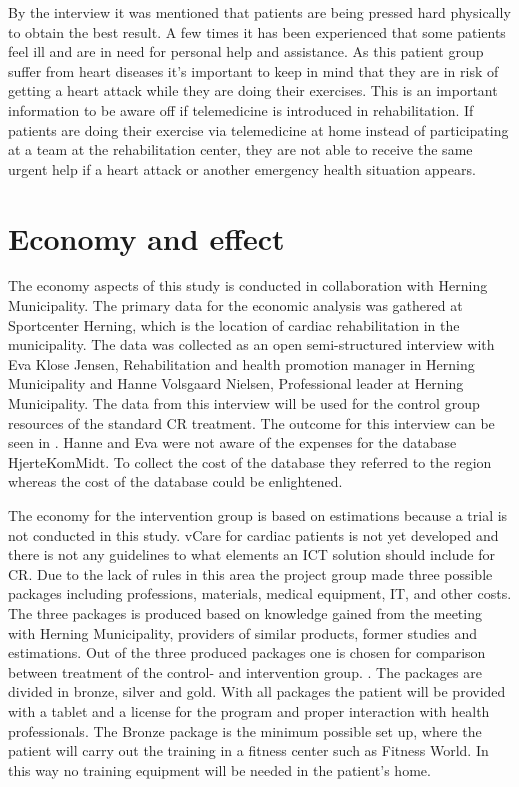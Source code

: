 By the interview it was mentioned that patients are being pressed hard physically to obtain the best result. A few times it has been experienced that some patients feel ill and are in need for personal help and assistance. As this patient group suffer from heart diseases it’s important to keep in mind that they are in risk of getting a heart attack while they are doing their exercises. This is an important information to be aware off if telemedicine is introduced in rehabilitation. If patients are doing their exercise via telemedicine at home instead of participating at a team at the rehabilitation center, they are not able to receive the same urgent help if a heart attack or another emergency health situation appears.         

\section{Economy and effect}

The economy aspects of this study is conducted in collaboration with Herning Municipality. The primary data for the economic analysis was gathered at Sportcenter Herning, which is the location of cardiac rehabilitation in the municipality. The data was collected as an open semi-structured interview with Eva Klose Jensen, Rehabilitation and health promotion manager in Herning Municipality and Hanne Volsgaard Nielsen, Professional leader at Herning Municipality. The data from this interview will be used for the control group resources of the standard CR treatment. The outcome for this interview can be seen in . Hanne and Eva were not aware of the expenses for the database HjerteKomMidt. To collect the cost of the database they referred to the region whereas the cost of the database could be enlightened\cite{hjerteKomMidt}.

The economy for the intervention group is based on estimations because a trial is not conducted in this study. vCare for cardiac patients is not yet developed and there is not any guidelines to what elements an ICT solution should include for CR. Due to the lack of rules in this area the project group made three possible packages including professions, materials, medical equipment, IT, and other costs. The three packages is produced based on knowledge gained from the meeting with Herning Municipality, providers of similar products, former studies and estimations. Out of the three produced packages one is chosen for comparison between treatment of the control- and intervention group.
. 
The packages are divided in bronze, silver and gold. With all packages the patient will be provided with a tablet and a license for the program and proper interaction with health professionals. 
The Bronze package is the minimum possible set up, where the patient will carry out the training in a fitness center such as Fitness World. In this way no training equipment will be needed in the patient’s home. 

